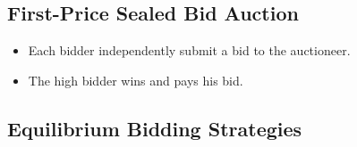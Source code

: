 \documentclass[
]{book}
\providecommand{\tightlist}{%
  \setlength{\itemsep}{0pt}\setlength{\parskip}{0pt}}
\begin{document}
\hypertarget{first-price-sealed-bid-auction}{%
\subsection{First-Price Sealed Bid Auction}\label{first-price-sealed-bid-auction}}

\begin{itemize}
\tightlist
\item
  Each bidder independently submit a bid to the auctioneer.
\item
  The high bidder wins and pays his bid.
\end{itemize}

\hypertarget{equilibrium-bidding-strategies-1}{%
\subsection{Equilibrium Bidding Strategies}\label{equilibrium-bidding-strategies-1}}
\end{document}
